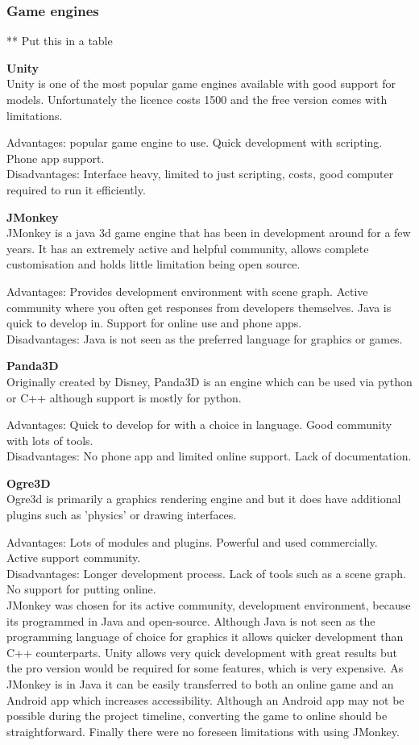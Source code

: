 \documentclass[11pt]{report}
\begin{document}
\subsubsection{Game engines}

** Put this in a table

\textbf{Unity}\\
Unity is one of the most popular game engines available with good support for models. Unfortunately the licence costs 1500 and the free version comes with limitations.

Advantages: popular game engine to use. Quick development with scripting. Phone app support.\\
Disadvantages: Interface heavy, limited to just scripting, costs, good computer required to run it efficiently.

\textbf{JMonkey}\\
JMonkey is a java 3d game engine that has been in development around for a few years. It has an extremely active and helpful community, allows complete customisation and holds little limitation being open source.

Advantages: Provides development environment with scene graph. Active community where you often get responses from developers themselves. Java is quick to develop in. Support for online use and phone apps. \\
Disadvantages: Java is not seen as the preferred language for graphics or games.

\textbf{Panda3D}\\
Originally created by Disney, Panda3D is an engine which can be used via python or C++ although support is mostly for python.

Advantages: Quick to develop for with a choice in language. Good community with lots of tools.\\
Disadvantages: No phone app and limited online support. Lack of documentation. 

\textbf{Ogre3D}\\
Ogre3d is primarily a graphics rendering engine and but it does have additional plugins such as 'physics' or drawing interfaces.

Advantages: Lots of modules and plugins. Powerful and used commercially. Active support community.\\
Disadvantages: Longer development process. Lack of tools such as a scene graph. No support for putting online.\\

JMonkey was chosen for its active community, development environment, because its programmed in Java and open-source. Although Java is not seen as the programming language of choice for graphics it allows quicker development than C++ counterparts. Unity allows very quick development with great results but the pro version would be required for some features, which is very expensive. As JMonkey is in Java it can be easily transferred to both an online game and an Android app which increases accessibility. Although an Android app may not be possible during the project timeline, converting the game to online should be straightforward. Finally there were no foreseen limitations with using JMonkey.
\end{document}

